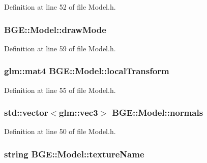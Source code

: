 Definition at line 52 of file Model.\-h.

\hypertarget{class_b_g_e_1_1_model_a7ff9d0fadd85be1fcbd0cd254c3e23ee}{
\subsubsection[{draw\-Mode}]{ B\-G\-E\-::\-Model\-::draw\-Mode}}\label{class_b_g_e_1_1_model_a7ff9d0fadd85be1fcbd0cd254c3e23ee}


Definition at line 59 of file Model.\-h.

\hypertarget{class_b_g_e_1_1_model_acfafbb8464feb0aa8695c9ec53407601}{
\subsubsection[{local\-Transform}]{\setlength{\rightskip}{0pt plus 5cm}glm\-::mat4 B\-G\-E\-::\-Model\-::local\-Transform}}\label{class_b_g_e_1_1_model_acfafbb8464feb0aa8695c9ec53407601}


Definition at line 55 of file Model.\-h.

\hypertarget{class_b_g_e_1_1_model_ac2e15ec05b6327a4a93c87d487e51c60}{
\subsubsection[{normals}]{\setlength{\rightskip}{0pt plus 5cm}std\-::vector$<$glm\-::vec3$>$ B\-G\-E\-::\-Model\-::normals}}\label{class_b_g_e_1_1_model_ac2e15ec05b6327a4a93c87d487e51c60}


Definition at line 50 of file Model.\-h.

\hypertarget{class_b_g_e_1_1_model_acaed7dd09ab85e191e342d96e54793e9}{
\subsubsection[{texture\-Name}]{\setlength{\rightskip}{0pt plus 5cm}string B\-G\-E\-::\-Model\-::texture\-Name}}\label{class_b_g_e_1_1_model_acaed7dd09ab85e191e342d96e54793e9}


